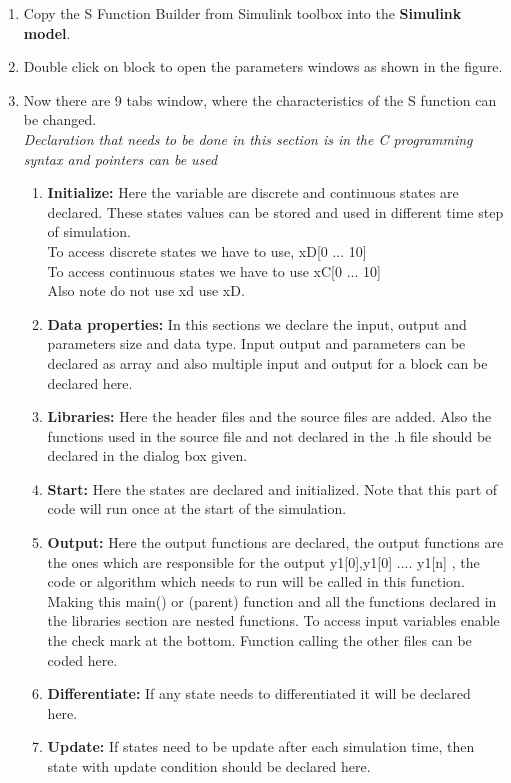 \documentclass{article}
\begin{document}
\begin{enumerate}
    \item Copy the S Function Builder from Simulink toolbox into the \textbf{Simulink model}.
    \item Double click on block to open the parameters windows as shown in the figure.
    \item Now there are 9 tabs window, where the characteristics of the S function can be changed. \\\textit{ Declaration that needs to be done in this section is in the C programming syntax and pointers can be used}
    \begin{enumerate}
        \item \textbf{Initialize:} Here the variable are discrete and continuous states are declared. These states values can be stored and used in different time step of simulation. \\
        To access discrete states we have to use, xD[0 ... 10]\\
        To access continuous states we have to use xC[0 ... 10]\\
        Also note do not use xd use xD. 
        \item \textbf{Data properties:} In this sections we declare the input, output and parameters size and data type. Input output and parameters can be declared as array and also multiple input and output for a block can be declared here.
        \item \textbf{Libraries:} Here the header files and the source files are added. Also the functions used in the source file and not declared in the .h file should be declared in the dialog box given.
        \item \textbf{Start:} Here the states are declared and initialized. Note that this part of code will run once at the start of the simulation. 
        \item \textbf{Output:} Here the output functions are declared, the output functions are the ones which are responsible for the output y1[0],y1[0] .... y1[n] , the code or algorithm which needs to run will be called in this function. Making this main() or (parent) function and all the functions declared in the libraries section are nested functions. To access input variables enable the check mark at the bottom. Function calling the other files can be coded here.
        \item \textbf{Differentiate:} If any state needs to differentiated it will be declared here.
        \item \textbf{Update:} If states need to be update after each simulation time, then state with update condition should be declared here.

\end{enumerate}
\end{enumerate}
\end{document}
